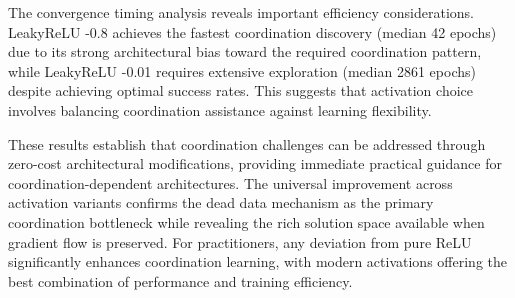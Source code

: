 The convergence timing analysis reveals important efficiency considerations. LeakyReLU -0.8 achieves the fastest coordination discovery (median 42 epochs) due to its strong architectural bias toward the required coordination pattern, while LeakyReLU -0.01 requires extensive exploration (median 2861 epochs) despite achieving optimal success rates. This suggests that activation choice involves balancing coordination assistance against learning flexibility.

These results establish that coordination challenges can be addressed through zero-cost architectural modifications, providing immediate practical guidance for coordination-dependent architectures. The universal improvement across activation variants confirms the dead data mechanism as the primary coordination bottleneck while revealing the rich solution space available when gradient flow is preserved. For practitioners, any deviation from pure ReLU significantly enhances coordination learning, with modern activations offering the best combination of performance and training efficiency.